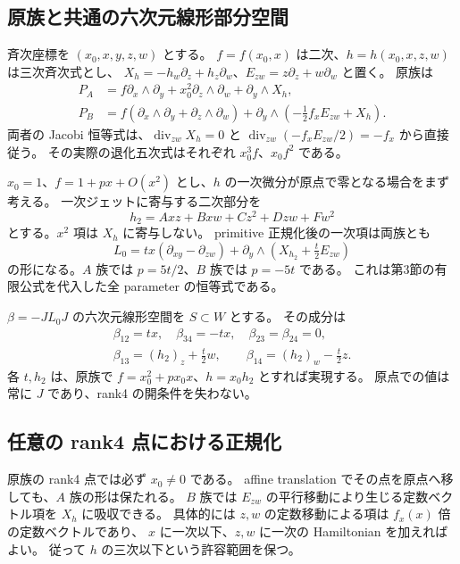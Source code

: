 \documentclass[11pt,a4paper]{ltjsarticle}
\theoremstyle{remark}
\begin{document}
\subsection{原族と共通の六次元線形部分空間}
斉次座標を $(x_0,x,y,z,w)$ とする。
$f=f(x_0,x)$ は二次、$h=h(x_0,x,z,w)$ は三次斉次式とし、
$X_h=-h_w\partial_z+h_z\partial_w$、$E_{zw}=z\partial_z+w\partial_w$ と置く。
原族は
\begin{align}
 P_A&=f\partial_x\wedge\partial_y+x_0^2\partial_z\wedge\partial_w
                  +\partial_y\wedge X_h,\label{eq:CA}\\
 P_B&=f(\partial_x\wedge\partial_y+\partial_z\wedge\partial_w)
           +\partial_y\wedge\left(-\tfrac12f_xE_{zw}+X_h\right).\label{eq:CB}
\end{align}
両者の Jacobi 恒等式は、$\operatorname{div}_{zw}X_h=0$ と
$\operatorname{div}_{zw}(-f_xE_{zw}/2)=-f_x$ から直接従う。
その実際の退化五次式はそれぞれ $x_0^3f$、$x_0f^2$ である。

$x_0=1$、$f=1+px+O(x^2)$ とし、$h$ の一次微分が原点で零となる場合をまず考える。
一次ジェットに寄与する二次部分を
\[
 h_2=A xz+B xw+Cz^2+Dzw+Fw^2
\]
とする。$x^2$ 項は $X_h$ に寄与しない。
primitive 正規化後の一次項は両族とも
\begin{equation}\label{eq:common-plane}
 L_0=tx(\partial_{xy}-\partial_{zw})
       +\partial_y\wedge\left(X_{h_2}+\tfrac t2E_{zw}\right)
\end{equation}
の形になる。$A$ 族では $p=5t/2$、$B$ 族では $p=-5t$ である。
これは第3節の有限公式を代入した全 parameter の恒等式である。

$\beta=-JL_0J$ の六次元線形空間を $S\subset W$ とする。
その成分は
\begin{gather}
 \beta_{12}=tx,\quad \beta_{34}=-tx,\quad
 \beta_{23}=\beta_{24}=0,\label{eq:S-form}\\
 \beta_{13}=(h_2)_z+\tfrac t2w,\qquad
 \beta_{14}=(h_2)_w-\tfrac t2z.\nonumber
\end{gather}
各 $t,h_2$ は、原族で $f=x_0^2+px_0x$、$h=x_0h_2$ とすれば実現する。
原点での値は常に $J$ であり、rank4 の開条件を失わない。

\subsection{任意の rank4 点における正規化}
原族の rank4 点では必ず $x_0\ne0$ である。
affine translation でその点を原点へ移しても、$A$ 族の形は保たれる。
$B$ 族では $E_{zw}$ の平行移動により生じる定数ベクトル項を $X_h$ に吸収できる。
具体的には $z,w$ の定数移動による項は $f_x(x)$ 倍の定数ベクトルであり、
$x$ に一次以下、$z,w$ に一次の Hamiltonian を加えればよい。
従って $h$ の三次以下という許容範囲を保つ。
\end{document}
